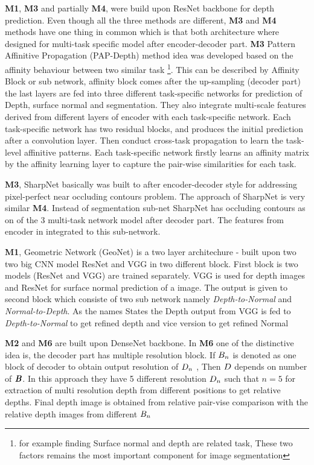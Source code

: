 \textbf{M1}, \textbf{M3} and partially \textbf{M4}, were build upon ResNet backbone for depth prediction. Even though all the three methods are different, \textbf{M3} and \textbf{M4} methods have one thing in common which is that both architecture where designed for multi-task specific model after encoder-decoder part. \textbf{M3} Pattern Affinitive Propagation (PAP-Depth) method idea was developed based on the affinity behaviour between two similar task \footnote{for example finding Surface normal and depth are related task, These two factors remains the  most important component for image segmentation}. This can be described by Affinity Block or sub network, affinity block comes after the up-sampling (decoder part) the last layers are fed into three different task-specific networks for prediction of Depth, surface normal and segmentation. They also integrate multi-scale features derived from different layers of encoder with each task-specific network. Each task-specific network has two residual blocks, and produces the initial prediction after a convolution layer. Then conduct cross-task propagation to learn the task-level affinitive patterns. Each task-specific network firstly learns an affinity matrix by the affinity learning layer to capture the pair-wise similarities for each task.

\textbf{M3}, SharpNet basically was built to after encoder-decoder style for addressing pixel-perfect near occluding contours  problem. The approach of SharpNet is very similar \textbf{M4}. Instead of segmentation sub-net SharpNet has  occluding contours as on of the 3 multi-task network model after decoder part. The features from encoder in integrated to this sub-network. 

\textbf{M1}, Geometric Network (GeoNet) is a two layer architechure - built upon two two big CNN model ResNet and VGG in two different block. First block is two models (ResNet and VGG) are trained separately. VGG is used for depth images and ResNet for surface normal prediction of a image. The output is given to second block which consiste of two sub network namely \textit{Depth-to-Normal} and \textit{Normal-to-Depth}. As the names States the Depth output from VGG is fed to  \textit{Depth-to-Normal} to get refined depth and vice version to get refined Normal

\textbf{M2} and \textbf{M6} are built upon DenseNet backbone. In \textbf{M6} one of the distinctive idea is, the decoder part has multiple resolution block. If \(\textbf{\textit{$B_n$}}\) is denoted as one block of decoder to obtain output resolution of \(\textbf{\textit{$D_n$}}\) , Then  \(\textbf{\textit{$D$}}\) depends on number of  \(\textbf{\textit{B}}\). In this approach they have 5 different resolution \(\textbf{\textit{$D_n$}}\)  such that \(n = 5\) for extraction of multi resolution depth from different positions to get relative depths. Final depth image is obtained from relative pair-vise comparison with the relative depth images from different \(\textbf{\textit{$B_n$}}\)

